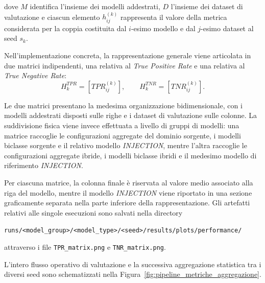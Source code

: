 dove $M$ identifica l'insieme dei modelli addestrati, $D$ l'insieme dei dataset di valutazione e ciascun elemento $h_{ij}^{(k)}$ rappresenta il valore della metrica considerata per la coppia costituita dal $i$-esimo modello e dal $j$-esimo dataset al seed $s_k$.

Nell'implementazione concreta, la rappresentazione generale viene articolata in due matrici indipendenti, una relativa al \textit{True Positive Rate} e una relativa al \textit{True Negative Rate}:
\begin{equation}
H_k^{TPR} = \left[ TPR_{ij}^{(k)} \right], \qquad H_k^{TNR} = \left[ TNR_{ij}^{(k)} \right].
\label{eq:hk_tpr_tnr}
\end{equation}

Le due matrici presentano la medesima organizzazione bidimensionale, con i modelli addestrati disposti sulle righe e i dataset di valutazione sulle colonne. 
La suddivisione fisica viene invece effettuata a livello di gruppi di modelli: una matrice raccoglie le configurazioni aggregate del dominio sorgente, i modelli biclasse sorgente e il relativo modello \textit{INJECTION}, mentre l'altra raccoglie le configurazioni aggregate ibride, i modelli biclasse ibridi e il medesimo modello di riferimento \textit{INJECTION}.

Per ciascuna matrice, la colonna finale è riservata al valore medio associato alla riga del modello, mentre il modello \textit{INJECTION} viene riportato in una sezione graficamente separata nella parte inferiore della rappresentazione. 
Gli artefatti relativi alle singole esecuzioni sono salvati nella directory 
\begin{center}
    \texttt{runs/<model\_group>/<model\_type>/<seed>/results/plots/performance/}
\end{center}
attraverso i file \texttt{TPR\_matrix.png} e \texttt{TNR\_matrix.png}.

L'intero flusso operativo di valutazione e la successiva aggregazione statistica tra i diversi seed sono schematizzati nella Figura~\ref{fig:pipeline_metriche_aggregazione}.

